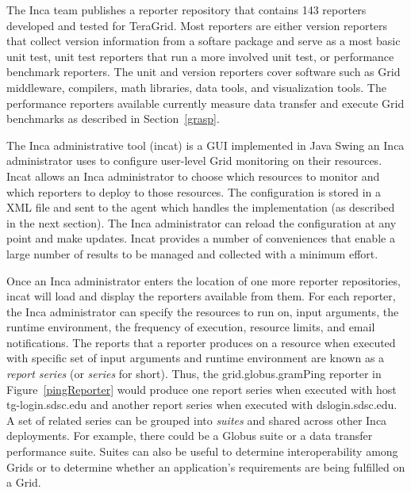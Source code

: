 \documentclass[times,10pt,twocolumn]{article}
\begin{document}
The Inca team publishes a reporter repository that contains 143 reporters
developed and tested for TeraGrid.  Most reporters are either version
reporters that collect version information from a softare package and
serve as a most basic unit test, unit test reporters that run a more involved
unit test, or performance benchmark reporters.  The unit and version
reporters cover software such as Grid middleware, compilers, math libraries,
data tools, and visualization tools.  The performance reporters available
currently measure data transfer and execute Grid benchmarks as described in
Section~\ref{grasp}.


The Inca administrative tool (incat) is a GUI implemented in Java Swing an
Inca administrator uses to configure user-level Grid monitoring on their
resources.  Incat allows an Inca administrator to choose which resources to
monitor and which reporters to deploy to those resources.  The configuration
is stored in a XML file and sent to the agent which handles the implementation
(as described in the next section).  The Inca administrator can reload the
configuration at any point and make updates.  Incat provides a number of
conveniences that enable a large number of results to be managed and collected
with a minimum effort.  

Once an Inca administrator enters the location of one more reporter
repositories, incat will load and display the reporters available from them.
For each reporter, the Inca administrator can specify the resources to run on,
input arguments, the runtime environment, the frequency of execution, resource
limits, and email notifications.  The reports that a reporter produces on a
resource when executed with specific set of input arguments and runtime
environment are known as a \emph{report series} (or \emph{series} for short).
Thus, the grid.globus.gramPing reporter in Figure~\ref{pingReporter} would
produce one report series when executed with host tg-login.sdsc.edu and
another report series when executed with dslogin.sdsc.edu.  A set of related
series can be grouped into \emph{suites} and shared across other Inca
deployments.  For example, there could be a Globus suite or a data transfer
performance suite.  Suites can also be useful to determine interoperability
among Grids or to determine whether an application's requirements are being
fulfilled on a Grid.
\end{document}
